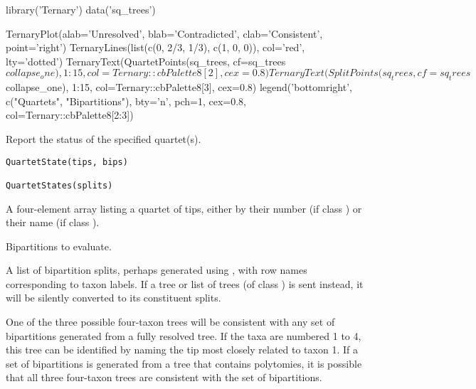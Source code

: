 \documentclass[a4paper]{book}
\begin{document}
\begin{Examples}
\begin{ExampleCode}
{
  library('Ternary')
  data('sq_trees')
  
  TernaryPlot(alab='Unresolved', blab='Contradicted', clab='Consistent', point='right')
  TernaryLines(list(c(0, 2/3, 1/3), c(1, 0, 0)), col='red', lty='dotted')
  TernaryText(QuartetPoints(sq_trees, cf=sq_trees$collapse_one), 1:15, 
    col=Ternary::cbPalette8[2], cex=0.8)
  TernaryText(SplitPoints(sq_trees, cf=sq_trees$collapse_one), 1:15, 
    col=Ternary::cbPalette8[3], cex=0.8)
  legend('bottomright', c("Quartets", "Bipartitions"), bty='n', pch=1, cex=0.8,
    col=Ternary::cbPalette8[2:3])
  
}

\end{ExampleCode}
\end{Examples}
%
\begin{Description}\relax
Report the status of the specified quartet(s).
\end{Description}
%
\begin{Usage}
\begin{verbatim}
QuartetState(tips, bips)

QuartetStates(splits)
\end{verbatim}
\end{Usage}
%
\begin{Arguments}
\begin{ldescription}
\item[\code{tips}] A four-element array listing a quartet of tips, either by their
number (if class ) or their name (if class ).

\item[\code{bips}] Bipartitions to evaluate.

\item[\code{splits}] A list of bipartition splits, perhaps generated using
, with row names corresponding
to taxon labels.
If a tree or list of trees (of class ) is sent instead,
it will be silently converted to its constituent splits.
\end{ldescription}
\end{Arguments}
%
\begin{Details}\relax
One of the three possible four-taxon trees will be consistent with any set of bipartitions
generated from a fully resolved tree.  If the taxa are numbered 1 to 4, this tree can be
identified by naming the tip most closely related to taxon 1.
If a set of bipartitions is generated from a tree that contains polytomies, it is possible
that all three four-taxon trees are consistent with the set of bipartitions.
\end{Details}
\end{document}
